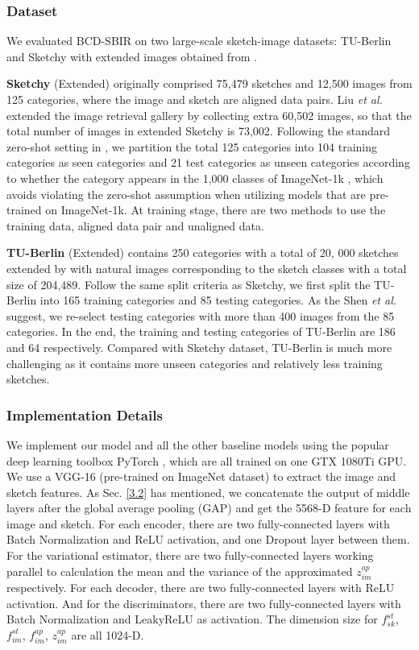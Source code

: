 \documentclass[10pt,twocolumn,letterpaper]{article}
\begin{document}
\subsubsection{Dataset}
We evaluated BCD-SBIR on two large-scale sketch-image datasets: TU-Berlin \cite{eitz2012hdhso} and Sketchy \cite{sangkloy2016sketchy} with extended images obtained from \cite{liu2017deep}.

\textbf{Sketchy} (Extended) \cite{sangkloy2016sketchy} originally comprised 75,479 sketches and 12,500 images from 125 categories, where the image and sketch are aligned data pairs. Liu \textit{et al.} \cite{liu2017deep} extended the image retrieval gallery by collecting extra 60,502 images, so that the total number of images in extended Sketchy is 73,002. Following the standard zero-shot setting in \cite{yelamarthi2018zero}, we partition the total 125 categories into 104 training categories as seen categories and 21 test categories as unseen categories according to whether the category appears in the 1,000 classes of ImageNet-1k \cite{deng2009imagenet}, which avoids violating the zero-shot assumption when utilizing models that are pre-trained on ImageNet-1k. At training stage, there are two methods to use the training data, aligned data pair and unaligned data.

\textbf{TU-Berlin} (Extended) \cite{eitz2012hdhso} contains 250 categories with a total of 20, 000 sketches extended by \cite{liu2017deep} with natural images corresponding to the sketch classes with a total size of 204,489. Follow the same split criteria as Sketchy, we first split the TU-Berlin into 165 training categories and 85 testing categories. As the Shen \textit{et al.} \cite{shen2018zero} suggest, we re-select testing categories with more than 400 images from the 85 categories. In the end, the training and testing categories of TU-Berlin are 186 and 64 respectively. Compared with Sketchy dataset, TU-Berlin is much more challenging as it contains more unseen categories and relatively less training sketches.

\subsubsection{Implementation Details}
We implement our model and all the other baseline models using the popular deep learning toolbox PyTorch \cite{paszke2017automatic}, which are all trained on one GTX 1080Ti GPU. We use a VGG-16 (pre-trained on ImageNet dataset) to extract the image and sketch features. As Sec. \ref{3.2} has mentioned, we concatenate the output of middle layers after the global average pooling (GAP) and get the 5568-D feature for each image and sketch. For each encoder, there are two fully-connected layers with Batch Normalization and ReLU activation, and one Dropout layer between them. For the variational estimator, there are two fully-connected layers working parallel to calculation the mean and the variance of the approximated $z_{im}^{ap}$ respectively. For each decoder, there are two fully-connected layers with ReLU activation. And for the discriminators, there are two fully-connected layers with Batch Normalization and LeakyReLU as activation. The dimension size for $f_{sk}^{st}$, $f_{im}^{st}$, $f_{im}^{ap}$, $z_{im}^{ap}$ are all 1024-D.
\end{document}
